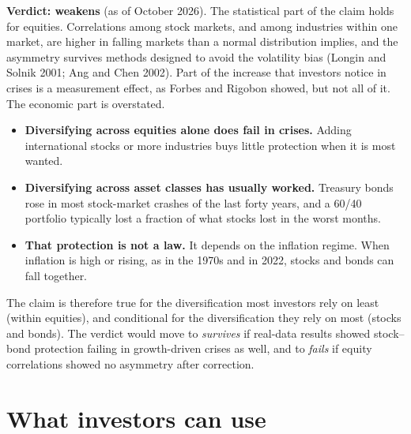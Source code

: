 \begin{callout}
\textbf{Verdict: weakens} (as of October 2026). The statistical part of the claim holds for equities. Correlations among stock markets, and among industries within one market, are higher in falling markets than a normal distribution implies, and the asymmetry survives methods designed to avoid the volatility bias (Longin and Solnik 2001; Ang and Chen 2002). Part of the increase that investors notice in crises is a measurement effect, as Forbes and Rigobon showed, but not all of it. The economic part is overstated.
\end{callout}

\begin{itemize}
  \item \textbf{Diversifying across equities alone does fail in crises.} Adding international stocks or more industries buys little protection when it is most wanted.
  \item \textbf{Diversifying across asset classes has usually worked.} Treasury bonds rose in most stock-market crashes of the last forty years, and a 60/40 portfolio typically lost a fraction of what stocks lost in the worst months.
  \item \textbf{That protection is not a law.} It depends on the inflation regime. When inflation is high or rising, as in the 1970s and in 2022, stocks and bonds can fall together.
\end{itemize}

The claim is therefore true for the diversification most investors rely on least (within equities), and conditional for the diversification they rely on most (stocks and bonds). The verdict would move to \emph{survives} if real-data results showed stock--bond protection failing in growth-driven crises as well, and to \emph{fails} if equity correlations showed no asymmetry after correction.

\section{What investors can use}
\label{sec:13-investors}

